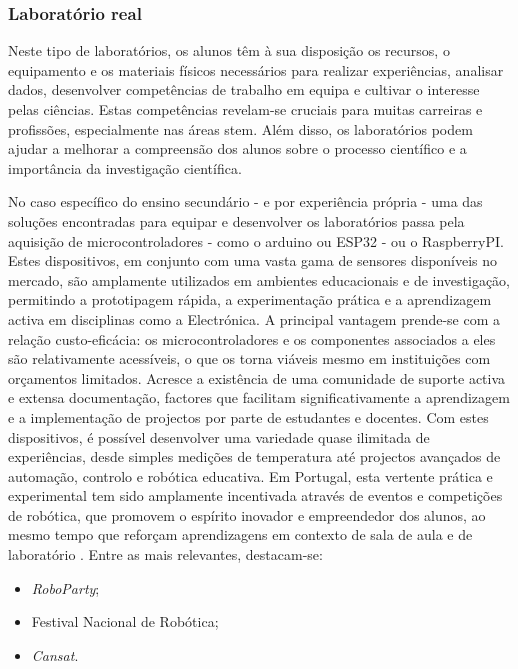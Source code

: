 \subsubsection{Laboratório real}
Neste tipo de laboratórios, os alunos têm à sua disposição os recursos, o equipamento e os materiais físicos necessários para realizar experiências, analisar dados, desenvolver competências de trabalho em equipa e cultivar o interesse pelas ciências. Estas competências revelam-se cruciais para muitas carreiras e profissões, especialmente nas áreas \acrshort{stem}. Além disso, os laboratórios podem ajudar a melhorar a compreensão dos alunos sobre o processo científico e a importância da investigação científica.

No caso específico do ensino secundário - e por experiência própria - uma das soluções encontradas para equipar e desenvolver os laboratórios passa pela aquisição de microcontroladores - como o \gls{arduino} ou \gls{ESP32} - ou o \gls{RaspberryPI}. Estes dispositivos, em conjunto com uma vasta gama de sensores disponíveis no mercado, são amplamente utilizados em ambientes educacionais e de investigação, permitindo a prototipagem rápida, a experimentação prática e a aprendizagem activa em disciplinas como a Electrónica. A principal vantagem prende-se com a relação custo-eficácia: os microcontroladores e os componentes associados a eles são relativamente acessíveis, o que os torna viáveis mesmo em instituições com orçamentos limitados. Acresce a existência de uma comunidade de suporte activa e extensa documentação, factores que facilitam significativamente a aprendizagem e a implementação de projectos por parte de estudantes e docentes. Com estes dispositivos, é possível desenvolver uma variedade quase ilimitada de experiências, desde simples medições de temperatura até projectos avançados de automação, controlo e robótica educativa.
Em Portugal, esta vertente prática e experimental tem sido amplamente incentivada através de eventos e competições de robótica, que promovem o espírito inovador e empreendedor dos alunos, ao mesmo tempo que reforçam aprendizagens em contexto de sala de aula e de laboratório \cite{roboparty, fnr, cansat}. Entre as mais relevantes, destacam-se:
\begin{itemize}
    \item \textit{RoboParty};
    \item Festival Nacional de Robótica;
    \item \textit{Cansat}.
\end{itemize}

